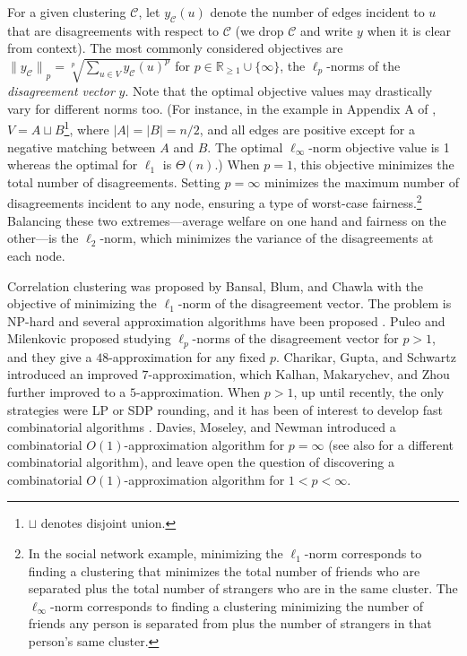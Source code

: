 \documentclass[11pt]{article}
\begin{document}
For a given clustering $\mathcal{C}$, let $y_{\mathcal{C}}(u)$ denote the number of edges incident to $u$ that are disagreements with respect to $\mathcal{C}$ (we drop $\mathcal{C}$ and write $y$ when it is clear from context).  
The most commonly considered objectives are ${\lVert y_{\mathcal{C}} \rVert}_p = \sqrt[p]{\sum_{u \in V} y_{\mathcal{C}}(u)^p}$ for $p \in \mathbb{R}_{\geq 1} \cup \{\infty\}$,
the $\ell_p$-norms of the \emph{disagreement vector} $y$.   
Note that the optimal objective values may drastically vary for different norms too.  (For instance, in the example in Appendix A of \cite{PM16}, $V=A \sqcup B$\footnote{$\sqcup$ denotes disjoint union.}, where $|A| = |B| = n/2$, and all edges are positive except for a negative matching between $A$ and $B$. The optimal $\ell_\infty$-norm objective value is 1 whereas the optimal for $\ell_1$ is $\Theta(n)$.)
When $p=1$, this objective minimizes the total number of disagreements.  Setting $p = \infty$ minimizes the maximum number of disagreements incident to any node, ensuring a type of worst-case fairness.\footnote{In the social network example, minimizing the $\ell_1$-norm corresponds to finding a clustering that minimizes the total number of friends who are separated plus the total number of strangers who are in the same cluster. The $\ell_\infty$-norm corresponds to finding a clustering minimizing the number of friends any person is separated from plus the number of strangers in that person's same cluster.}  
Balancing these two extremes---average welfare on one hand and fairness on the other---is the $\ell_2$-norm, which minimizes the variance of the disagreements at each node.


Correlation clustering was proposed by Bansal, Blum, and Chawla \citeyearpar{BBC04} with the objective of minimizing the $\ell_1$-norm of the disagreement vector.
The problem is \textsf{NP}-hard and several approximation algorithms have been proposed \cite{BBC04, ACN-pivot, chawla2015near, cohen2022correlation}.  
Puleo and Milenkovic \citeyearpar{PM16} proposed studying $\ell_p$-norms of the disagreement vector for $p >1$, and they give a $48$-approximation for any fixed $p$. 
Charikar, Gupta, and Schwartz \citeyearpar{CGS17} introduced an improved $7$-approximation, which  Kalhan,  Makarychev, and  Zhou \citeyearpar{KMZ19} further improved to a $5$-approximation. When $p >1$, up until recently, the only strategies were LP or SDP rounding, and it has been of interest to develop fast combinatorial algorithms \cite{veldt2022correlation}.   
Davies, Moseley, and Newman \citeyearpar{DMN23} introduced a combinatorial $O(1)$-approximation algorithm for $p= \infty$ (see also \cite{minmax4approx} for a different combinatorial algorithm),
and leave open the question of discovering a combinatorial $O(1)$-approximation algorithm for $1 < p < \infty$.
\end{document}
